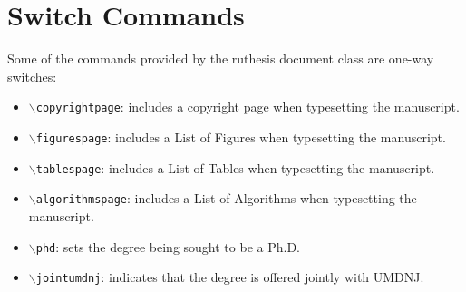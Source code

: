 \section{Switch Commands}
Some of the commands provided by the ruthesis document class are one-way switches:
\begin{itemize}
\item $\backslash$\texttt{copyrightpage}: includes a copyright page when typesetting the manu\-script.
\item $\backslash$\texttt{figurespage}: includes a List of Figures when typesetting the manu\-script.
\item $\backslash$\texttt{tablespage}: includes a List of Tables when typesetting the manuscript.
\item $\backslash$\texttt{algorithmspage}: includes a List of Algorithms when typesetting the manuscript.
\item $\backslash$\texttt{phd}: sets the degree being sought to be a Ph.D.
\item $\backslash$\texttt{jointumdnj}: indicates that the degree is offered jointly with UMDNJ.
\end{itemize}

